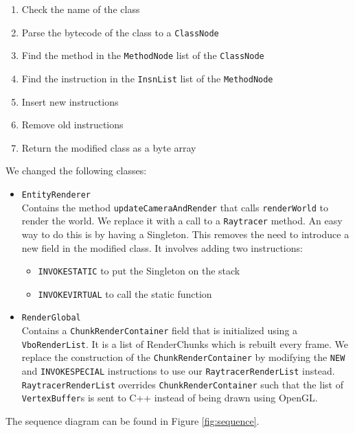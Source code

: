 \documentclass[]{article}
\begin{document}
\begin{enumerate}
  \item Check the name of the class
  \item Parse the bytecode of the class to a \texttt{ClassNode}
  \item Find the method in the \texttt{MethodNode} list of the \texttt{ClassNode}
  \item Find the instruction in the \texttt{InsnList} list of the \texttt{MethodNode}
  \item Insert new instructions
  \item Remove old instructions
  \item Return the modified class as a byte array
\end{enumerate}

We changed the following classes:

\begin{itemize}
  \item \texttt{EntityRenderer} \\
    Contains the method \texttt{updateCameraAndRender} that calls \texttt{renderWorld} to render the world.
    We replace it with a call to a \texttt{Raytracer} method.
    An easy way to do this is by having a Singleton.
    This removes the need to introduce a new field in the modified class.
    It involves adding two instructions:
    \begin{itemize}
      \item \texttt{INVOKESTATIC} to put the Singleton on the stack
      \item \texttt{INVOKEVIRTUAL} to call the static function
    \end{itemize}
  \item \texttt{RenderGlobal} \\
    Contains a \texttt{ChunkRenderContainer} field that is initialized using a \texttt{VboRenderList}.
    It is a list of RenderChunks which is rebuilt every frame.
    We replace the construction of the \texttt{ChunkRenderContainer} by modifying the \texttt{NEW} and \texttt{INVOKESPECIAL} instructions to use our \texttt{RaytracerRenderList} instead.
    \texttt{RaytracerRenderList} overrides \texttt{ChunkRenderContainer} such that the list of \texttt{VertexBuffer}s is sent to C++ instead of being drawn using OpenGL.
\end{itemize}
The sequence diagram can be found in Figure \ref{fig:sequence}.

\end{document}

